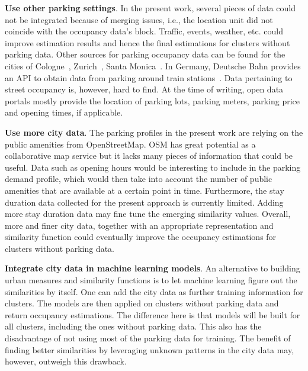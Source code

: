 \begin{enumerate}
	\item \textbf{Use other parking settings}.
	In the present work, several pieces of data could not be integrated because of merging issues, i.e., the location unit did not coincide with the occupancy data's block.
	Traffic, events, weather, etc. could improve estimation results and hence the final estimations for clusters without parking data.
	Other sources for parking occupancy data can be found for the cities of Cologne~\cite{cologne_data}, Zurich~\cite{zurich_data}, Santa Monica~\cite{santa_monica_data}.
	In Germany, Deutsche Bahn provides an API to obtain data from parking around train stations~\cite{dbbahn_data}.
	Data pertaining to street occupancy is, however, hard to find.
	At the time of writing, open data portals mostly provide the location of parking lots, parking meters, parking price and opening times, if applicable.  
	
	\item \textbf{Use more city data}.
	The parking profiles in the present work are relying on the public amenities from OpenStreetMap.
	OSM has great potential as a collaborative map service but it lacks many pieces of information that could be useful.
	Data such as opening hours would be interesting to include in the parking demand profile, which would then take into account the number of public amenities that are available at a certain point in time.
	Furthermore, the stay duration data collected for the present approach is currently limited.
	Adding more stay duration data may fine tune the emerging similarity values.
	Overall, more and finer city data, together with an appropriate representation and similarity function could eventually improve the occupancy estimations for clusters without parking data. 
	
	{\color{red}
	\item \textbf{Integrate city data in machine learning models}.
	An alternative to building urban measures and similarity functions is to let machine learning figure out the similarities by itself.
	One can add the city data as further training information for clusters.
	The models are then applied on clusters without parking data and return occupancy estimations.
	The difference here is that models will be built for all clusters, including the ones without parking data.
	This also has the disadvantage of not using most of the parking data for training.
	The benefit of finding better similarities by leveraging unknown patterns in the city data may, however, outweigh this drawback. 
	}
	

\end{enumerate}
